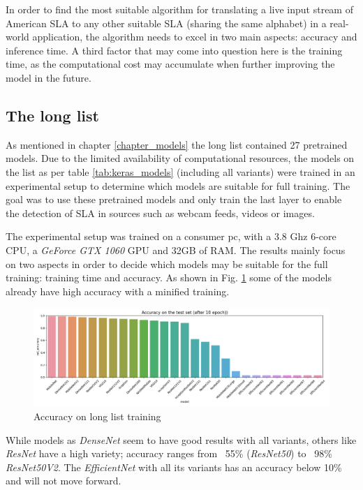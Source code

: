 In order to find the most suitable algorithm for translating a live input stream of American SLA to any other suitable SLA (sharing the same alphabet) in a real-world application, the algorithm needs to excel in two main aspects: accuracy and inference time. A third factor that may come into question here is the training time, as the computational cost may accumulate when further improving the model in the future.

\subsection{The long list}\label{chapter_long}
As mentioned in chapter \ref{chapter_models} the long list contained 27 pretrained models. Due to the limited availability of computational resources, the models on the list as per table \ref{tab:keras_models} (including all variants) were trained in an experimental setup to determine which models are suitable for full training. The goal was to use these pretrained models and only train the last layer to enable the detection of SLA in sources such as webcam feeds, videos or images.

The experimental setup was trained on a consumer pc, with a 3.8 Ghz 6-core CPU, a \textit{GeForce GTX 1060} GPU and 32GB of RAM. The results mainly focus on two aspects in order to decide which models may be suitable for the full training: training time and accuracy. As shown in Fig. \ref{fig:long_list_acc} some of the models already have high accuracy with a minified training.

\begin{figure}[h]
    \centering
    \caption{Accuracy on long list training}
	\label{fig:long_list_acc}
    \includegraphics[width=\linewidth]{figures/long_val_accuracy.png}
\end{figure}

While models as \textit{DenseNet} seem to have good results with all variants, others like \textit{ResNet} have a high variety; accuracy ranges from ~55\% (\textit{ResNet50}) to ~98\% \textit{ResNet50V2}. The \textit{EfficientNet} with all its variants has an accuracy below 10\% and will not move forward.

